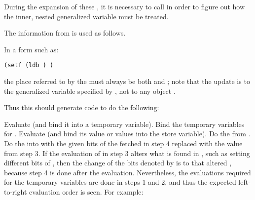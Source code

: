 During the  expansion of these , it is necessary to call 
in order to figure out how the inner, nested generalized variable must be treated.  
 
The information from
is used as follows.
\beginlist
{} 
 
In a form such as:
       
{\tt (setf (ldb  ) )}
 
the place referred to by the  must always be both  
and ;  note that the update is to the generalized variable 
specified by , not to any object .
       
Thus this  should generate code to do the following:
 
\beginlist
{} Evaluate  (and bind it into a temporary variable).
 Bind the temporary variables for .
 Evaluate   (and bind 
its value or values into the store variable).
 Do the  from .
 Do the  into  with 
the given bits of the 
       fetched in step 4 replaced with the value from step 3.
\endlist 
    If the evaluation of  
in step 3 alters what is found in ,
such as setting different bits of ,
    then the change of the bits denoted by 
 is to that 
    altered , 
because step 4 is done after the 
    evaluation.  Nevertheless, the 
    evaluations required for  
the temporary variables are done in steps 1 and 
    2, and thus the expected left-to-right evaluation order is seen.
For example:

